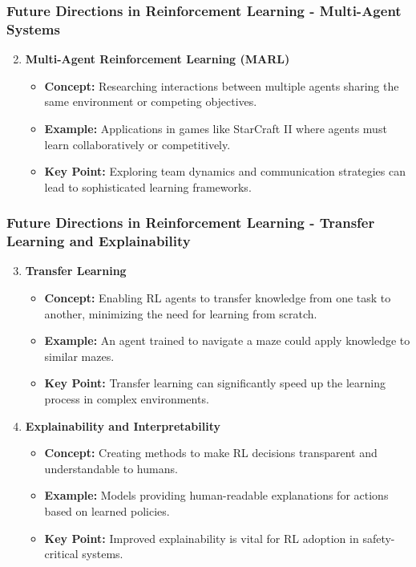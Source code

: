 \documentclass[aspectratio=169]{beamer}
\begin{document}
\begin{frame}
    \frametitle{Future Directions in Reinforcement Learning - Multi-Agent Systems}
    \begin{enumerate}
        \setcounter{enumi}{1}
        \item \textbf{Multi-Agent Reinforcement Learning (MARL)}
            \begin{itemize}
                \item \textbf{Concept:} Researching interactions between multiple agents sharing the same environment or competing objectives.
                \item \textbf{Example:} Applications in games like StarCraft II where agents must learn collaboratively or competitively.
                \item \textbf{Key Point:} Exploring team dynamics and communication strategies can lead to sophisticated learning frameworks.
            \end{itemize}
    \end{enumerate}
\end{frame}

\begin{frame}
    \frametitle{Future Directions in Reinforcement Learning - Transfer Learning and Explainability}
    \begin{enumerate}
        \setcounter{enumi}{2}
        \item \textbf{Transfer Learning}
            \begin{itemize}
                \item \textbf{Concept:} Enabling RL agents to transfer knowledge from one task to another, minimizing the need for learning from scratch.
                \item \textbf{Example:} An agent trained to navigate a maze could apply knowledge to similar mazes.
                \item \textbf{Key Point:} Transfer learning can significantly speed up the learning process in complex environments.
            \end{itemize}

        \item \textbf{Explainability and Interpretability}
            \begin{itemize}
                \item \textbf{Concept:} Creating methods to make RL decisions transparent and understandable to humans.
                \item \textbf{Example:} Models providing human-readable explanations for actions based on learned policies.
                \item \textbf{Key Point:} Improved explainability is vital for RL adoption in safety-critical systems.
            \end{itemize}
    \end{enumerate}
\end{frame}
\end{document}
